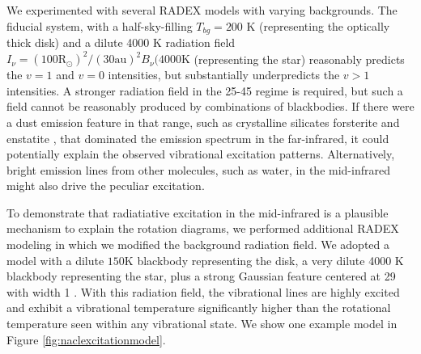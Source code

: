 \documentclass[twocolumn]{aastex62}
\begin{document}
We experimented with several RADEX models with varying backgrounds.  The
fiducial system, with a half-sky-filling $T_{bg}=200$ K (representing the
optically thick disk) and a dilute 4000 K radiation field $I_{\nu} = (100
\mathrm{R_\odot})^2 / (30 \mathrm{au})^2 B_\nu(4000 \mathrm{K}$ (representing
the star) reasonably predicts the $v=1$ and $v=0$ intensities, but
substantially underpredicts the $v>1$ intensities.  A stronger radiation
field in the 25-45 \um regime is required, but such a field cannot be
reasonably produced by combinations of blackbodies.  If there were a dust
emission feature in that range, such as crystalline silicates forsterite
and enstatite \citep[e.g.][]{Molster2005a}, that dominated the emission spectrum
in the far-infrared, it could potentially explain the observed vibrational
excitation patterns.  Alternatively, bright emission lines from other molecules,
such as water, in the mid-infrared might also drive the peculiar excitation.

To demonstrate that radiatiative excitation in the mid-infrared is a plausible
mechanism to explain the rotation diagrams, we performed additional RADEX
modeling in which we modified the background radiation field.  We adopted a
model with a dilute $150$K blackbody representing the disk, a very dilute 4000
K blackbody representing the star, plus a strong Gaussian feature centered at
29 \um with width 1 \um.  With this radiation field, the vibrational lines 
are highly excited and exhibit a vibrational temperature significantly higher
than the rotational temperature seen within any vibrational state.
We show one example model in Figure \ref{fig:naclexcitationmodel}.
\end{document}

